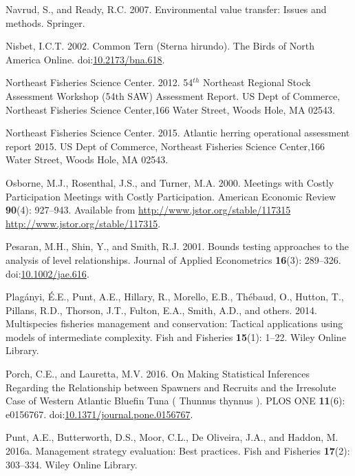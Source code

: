 \documentclass[]{article}
\begin{document}
\hypertarget{ref-navrud2007environmental}{}
Navrud, S., and Ready, R.C. 2007. Environmental value transfer: Issues
and methods. Springer.

\hypertarget{ref-nisbet_common_2002}{}
Nisbet, I.C.T. 2002. Common Tern (Sterna hirundo). The Birds of North
America Online.
doi:\href{https://doi.org/10.2173/bna.618}{10.2173/bna.618}.

\hypertarget{ref-NEFSC2012Assessment}{}
Northeast Fisheries Science Center. 2012. 54\(^{th}\) Northeast Regional
Stock Assessment Workshop (54th SAW) Assessment Report. US Dept of
Commerce, Northeast Fisheries Science Center,166 Water Street, Woods
Hole, MA 02543.

\hypertarget{ref-Deroba2015atlantic}{}
Northeast Fisheries Science Center. 2015. Atlantic herring operational
assessment report 2015. US Dept of Commerce, Northeast Fisheries Science
Center,166 Water Street, Woods Hole, MA 02543.

\hypertarget{ref-Osborne2000MeetingsParticipation}{}
Osborne, M.J., Rosenthal, J.S., and Turner, M.A. 2000. Meetings with
Costly Participation Meetings with Costly Participation. American
Economic Review \textbf{90}(4): 927--943. Available from
\href{http://www.jstor.org/stable/117315\%20http://www.jstor.org/stable/117315}{http://www.jstor.org/stable/117315 http://www.jstor.org/stable/117315}.

\hypertarget{ref-Pesaran2001BoundsRelationships}{}
Pesaran, M.H., Shin, Y., and Smith, R.J. 2001. Bounds testing approaches
to the analysis of level relationships. Journal of Applied Econometrics
\textbf{16}(3): 289--326.
doi:\href{https://doi.org/10.1002/jae.616}{10.1002/jae.616}.

\hypertarget{ref-plaganyi2014multispecies}{}
Plagányi, É.E., Punt, A.E., Hillary, R., Morello, E.B., Thébaud, O.,
Hutton, T., Pillans, R.D., Thorson, J.T., Fulton, E.A., Smith, A.D., and
others. 2014. Multispecies fisheries management and conservation:
Tactical applications using models of intermediate complexity. Fish and
Fisheries \textbf{15}(1): 1--22. Wiley Online Library.

\hypertarget{ref-porch_making_2016}{}
Porch, C.E., and Lauretta, M.V. 2016. On Making Statistical Inferences
Regarding the Relationship between Spawners and Recruits and the
Irresolute Case of Western Atlantic Bluefin Tuna ( Thunnus thynnus ).
PLOS ONE \textbf{11}(6): e0156767.
doi:\href{https://doi.org/10.1371/journal.pone.0156767}{10.1371/journal.pone.0156767}.

\hypertarget{ref-punt2016management}{}
Punt, A.E., Butterworth, D.S., Moor, C.L., De Oliveira, J.A., and
Haddon, M. 2016a. Management strategy evaluation: Best practices. Fish
and Fisheries \textbf{17}(2): 303--334. Wiley Online Library.
\end{document}
